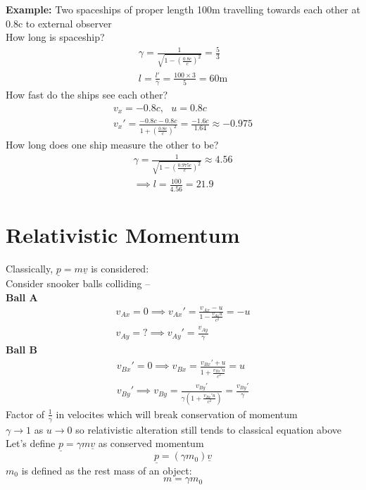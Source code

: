 \documentclass[a4paper, 11pt, fleqn, normalem]{report}
\begin{document}
\textbf{Example: }Two spaceships of proper length 100m travelling towards each other at 0.8c to external observer \\
How long is spaceship?
\begin{gather*}
    \gamma = \frac{1}{\sqrt{1 - (\tfrac{0.8c}{c})^{2}}} = \frac{5}{3} \\
    l = \frac{l'}{\gamma} = \frac{100\times3}{5} = 60\text{m}
\end{gather*}
How fast do the ships see each other?
\begin{gather*}
    v_{x} = -0.8c,~~~u = 0.8c \\
    v_{x}' = \frac{-0.8c - 0.8c}{1 + (\tfrac{0.8c}{c})^{2}} = \frac{-1.6c}{1.64} \approx -0.975
\end{gather*}
How long does one ship measure the other to be?
\begin{gather*}
    \gamma = \frac{1}{\sqrt{1 - (\tfrac{0.975c}{c})^{2}}} \approx 4.56 \\
    \implies l = \frac{100}{4.56} = 21.9
\end{gather*}

\section{Relativistic Momentum}
Classically, $\underline{p} = m\underline{v}$ is considered: \\
Consider snooker balls colliding -- \\
\textbf{Ball A}
\begin{gather*}
    v_{Ax} = 0 \implies v_{Ax}' = \frac{v_{Ax} - u}{1 - \tfrac{v_{Ax}u}{c^{2}}} = -u \\
    v_{Ay} = ? \implies v_{Ay}' = \frac{v_{Ay}}{\gamma}
\end{gather*}
\textbf{Ball B}
\begin{gather*}
    v_{Bx}' = 0 \implies v_{Bx} = \frac{v_{Bx}' + u}{1 + \tfrac{v_{Bx}'u}{c^{2}}} = u \\
    v_{By}' \implies v_{By} = \frac{v_{By}'}{\gamma(1 + \tfrac{v_{Bx}'u}{c^{2}})} = \frac{v_{By}'}{\gamma}
\end{gather*}
Factor of $\frac{1}{\gamma}$ in velocites which will break conservation of momentum \\
$\gamma \rightarrow 1$ as $u \rightarrow 0$ so relativistic alteration still tends to classical equation above \\
Let's define $\underline{p} = \gamma m\underline{v}$ as conserved momentum
\begin{equation*}
    \underline{p} = (\gamma m_{0})\underline{v}
\end{equation*}
$m_{0}$ is defined as the rest mass of an object:
\begin{equation*}
    m = \gamma m_{0}
\end{equation*}
\end{document}
